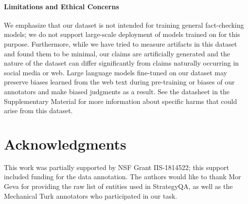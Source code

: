 \paragraph{Limitations and Ethical Concerns} We emphasize that our dataset is not intended for training general fact-checking models; we do not support large-scale deployment of models trained on \ours for this purpose. Furthermore, while we have tried to measure artifacts in this dataset and found them to be minimal, our claims are artificially generated and the nature of the dataset can differ significantly from claims naturally occurring in social media or web. 
Large language models fine-tuned on our dataset may preserve biases learned from the web text during pre-training or biases of our annotators and make biased judgments as a result. See the datasheet in the Supplementary Material for more information about specific harms that could arise from this dataset.

\section*{Acknowledgments}

This work was partially supported by NSF Grant IIS-1814522; this support included funding for the data annotation. The authors would like to thank Mor Geva for providing the raw list of entities used in StrategyQA, as well as the Mechanical Turk annotators who participated in our task.

\medskip

{
\small
}

\newpage

